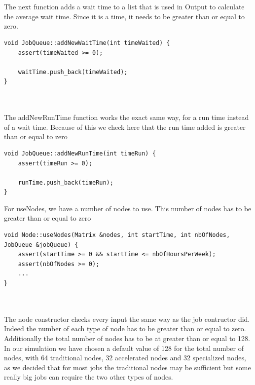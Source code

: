 \documentclass [10 pt, a4 paper]{report}
\begin{document}
\noindent
\\ \\
The next function adds a wait time to a list that is used in Output to calculate the average wait time. Since it is a time, it needs to be greater than or equal to zero.


\begin{lstlisting}[caption=addNewWaitTime function of the class JobQueue, label={lst:code1}, frame=single]
void JobQueue::addNewWaitTime(int timeWaited) {
	assert(timeWaited >= 0);

	waitTime.push_back(timeWaited);
}
\end{lstlisting}

\noindent
\\ \\
The addNewRunTime function works the exact same way, for a run time instead of a wait time. Because of this we check here that the run time added is greater than or equal to zero


\begin{lstlisting}[caption=addNewRunTime function of the class JobQueue, label={lst:code1}, frame=single]
void JobQueue::addNewRunTime(int timeRun) {
	assert(timeRun >= 0);

	runTime.push_back(timeRun);
}
\end{lstlisting}


\noindent
\clearpage
For useNodes, we have a number of nodes to use. This number of nodes has to be greater than or equal to zero


\begin{lstlisting}[caption=useNodes function of the class Node, label={lst:code1}, frame=single]
void Node::useNodes(Matrix &nodes, int startTime, int nbOfNodes, 
JobQueue &jobQueue) {
	assert(startTime >= 0 && startTime <= nbOfHoursPerWeek);
	assert(nbOfNodes >= 0);
	...
}
\end{lstlisting}


\noindent
\\ \\
The node constructor checks every input the same way as the job contructor did. Indeed the number of each type of node has to be greater than or equal to zero. Additionally the total number of nodes has to be at greater than or equal to 128. In our simulation we have chosen a default value of 128 for the total number of nodes, with 64 traditional nodes, 32 accelerated nodes and 32 specialized nodes, as we decided that for most jobs the traditional nodes may be sufficient but some really big jobs can require the two other types of nodes.
\end{document}
